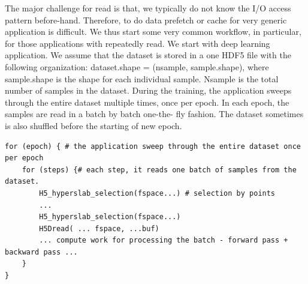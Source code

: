 \documentclass[aps, rmp, 11pt, notitlepage]{revtex4-1}
\begin{document}
The major challenge for read is that, we typically do not know the I/O access pattern before-hand. Therefore, to do data prefetch or cache for very generic application is difficult. We thus start some very common workflow, in particular, for those applications with repeatedly read. We start with deep learning application.
We assume that the dataset is stored in a one HDF5 file with the following organization: dataset.shape = (nsample, sample.shape), where sample.shape is the shape for each individual sample. Nsample is the total number of samples in the dataset. During the training, the application sweeps through the entire dataset multiple times, once per epoch. In each epoch, the samples are read in a batch by batch one-the- fly fashion. The dataset sometimes is also shuffled before the starting of new epoch.
\begin{lstlisting}
for (epoch) { # the application sweep through the entire dataset once per epoch
	for (steps) {# each step, it reads one batch of samples from the dataset. 
		H5_hyperslab_selection(fspace...) # selection by points 
		...
		H5_hyperslab_selection(fspace...)
		H5Dread( ... fspace, ...buf)
		... compute work for processing the batch - forward pass + backward pass ... 
	}
}
\end{lstlisting}
\end{document}
